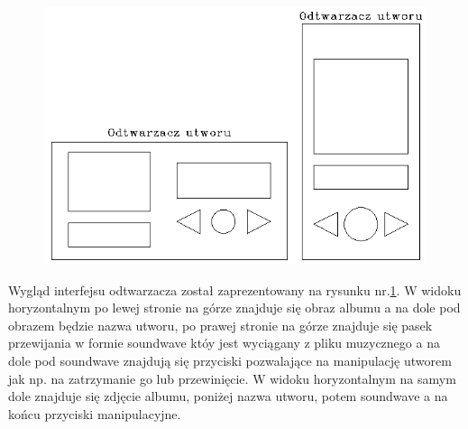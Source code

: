 \begin{figure}[H]
	\centering
	\includegraphics[width=1\linewidth]{images/mockup3_odtwarzacz}
	\caption{}
	\label{fig:mockup3odtwarzacz}
\end{figure}

Wygląd interfejsu odtwarzacza został zaprezentowany na rysunku nr.\ref{fig:mockup3odtwarzacz}. W widoku horyzontalnym po lewej stronie na górze znajduje się obraz albumu a na dole pod obrazem będzie nazwa utworu, po prawej stronie na górze znajduje się pasek przewijania w formie soundwave któy jest wyciągany z pliku muzycznego a na dole pod soundwave znajdują się przyciski pozwalające na manipulację utworem jak np. na zatrzymanie go lub przewinięcie. W widoku horyzontalnym na samym dole znajduje się zdjęcie albumu, poniżej nazwa utworu, potem soundwave a na końcu przyciski manipulacyjne.
